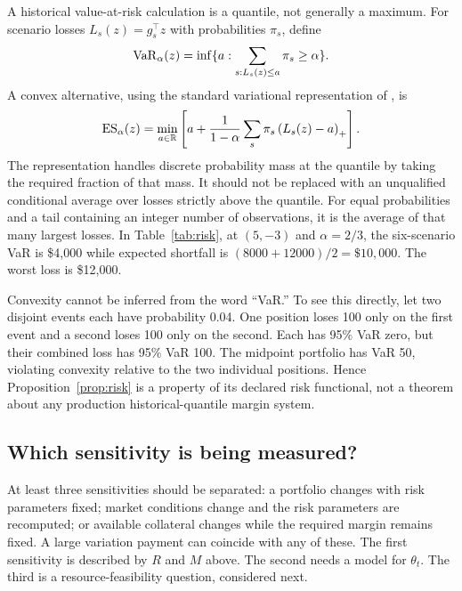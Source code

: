 A historical value-at-risk calculation is a quantile, not generally a maximum. For scenario losses $L_s(z)=g_s^\top z$ with probabilities $\pi_s$, define
\begin{equation}
 \operatorname{VaR}_\alpha(z)=\inf\{a:\sum_{s:L_s(z)\le a}\pi_s\ge\alpha\}.
\end{equation}
A convex alternative, using the standard variational representation of \citet{Rockafellar2000}, is
\begin{equation}
 \operatorname{ES}_\alpha(z)=\min_{a\in\mathbb R}
 \left[a+\frac{1}{1-\alpha}\sum_s\pi_s\left(L_s(z)-a\right)_+\right].
\label{eq:es}
\end{equation}
The representation handles discrete probability mass at the quantile by taking the required fraction of that mass. It should not be replaced with an unqualified conditional average over losses strictly above the quantile. For equal probabilities and a tail containing an integer number of observations, it is the average of that many largest losses. In Table~\ref{tab:risk}, at $(5,-3)$ and $\alpha=2/3$, the six-scenario VaR is \$4,000 while expected shortfall is $(8000+12000)/2=\$10,000$. The worst loss is \$12,000.

Convexity cannot be inferred from the word ``VaR.'' To see this directly, let two disjoint events each have probability 0.04. One position loses 100 only on the first event and a second loses 100 only on the second. Each has 95\% VaR zero, but their combined loss has 95\% VaR 100. The midpoint portfolio has VaR 50, violating convexity relative to the two individual positions. Hence Proposition~\ref{prop:risk} is a property of its declared risk functional, not a theorem about any production historical-quantile margin system.

\subsection{Which sensitivity is being measured?}

At least three sensitivities should be separated: a portfolio changes with risk parameters fixed; market conditions change and the risk parameters are recomputed; or available collateral changes while the required margin remains fixed. A large variation payment can coincide with any of these. The first sensitivity is described by $R$ and $M$ above. The second needs a model for $\theta_t$. The third is a resource-feasibility question, considered next.
\FloatBarrier
